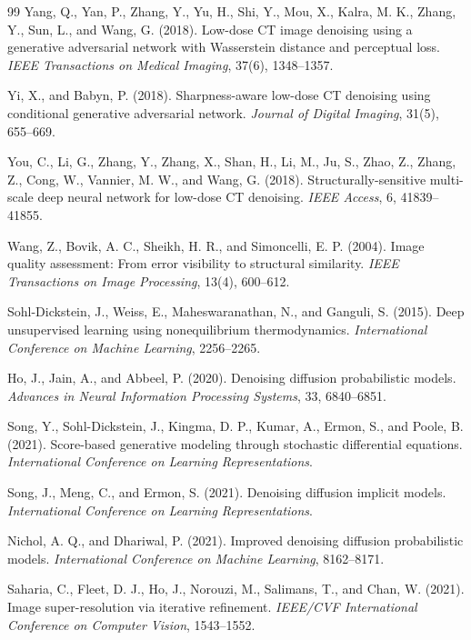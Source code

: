 \documentclass{article}
\begin{document}
{\begin{thebibliography}{99}
Yang, Q., Yan, P., Zhang, Y., Yu, H., Shi, Y., Mou, X., Kalra, M. K., Zhang, Y., Sun, L., and Wang, G. (2018).
Low-dose CT image denoising using a generative adversarial network with Wasserstein distance and perceptual loss.
\textit{IEEE Transactions on Medical Imaging}, 37(6), 1348--1357.

Yi, X., and Babyn, P. (2018).
Sharpness-aware low-dose CT denoising using conditional generative adversarial network.
\textit{Journal of Digital Imaging}, 31(5), 655--669.

You, C., Li, G., Zhang, Y., Zhang, X., Shan, H., Li, M., Ju, S., Zhao, Z., Zhang, Z., Cong, W., Vannier, M. W., and Wang, G. (2018).
Structurally-sensitive multi-scale deep neural network for low-dose CT denoising.
\textit{IEEE Access}, 6, 41839--41855.

Wang, Z., Bovik, A. C., Sheikh, H. R., and Simoncelli, E. P. (2004).
Image quality assessment: From error visibility to structural similarity.
\textit{IEEE Transactions on Image Processing}, 13(4), 600--612.

Sohl-Dickstein, J., Weiss, E., Maheswaranathan, N., and Ganguli, S. (2015).
Deep unsupervised learning using nonequilibrium thermodynamics.
\textit{International Conference on Machine Learning}, 2256--2265.

Ho, J., Jain, A., and Abbeel, P. (2020).
Denoising diffusion probabilistic models.
\textit{Advances in Neural Information Processing Systems}, 33, 6840--6851.

Song, Y., Sohl-Dickstein, J., Kingma, D. P., Kumar, A., Ermon, S., and Poole, B. (2021).
Score-based generative modeling through stochastic differential equations.
\textit{International Conference on Learning Representations}.

Song, J., Meng, C., and Ermon, S. (2021).
Denoising diffusion implicit models.
\textit{International Conference on Learning Representations}.

Nichol, A. Q., and Dhariwal, P. (2021).
Improved denoising diffusion probabilistic models.
\textit{International Conference on Machine Learning}, 8162--8171.

Saharia, C., Fleet, D. J., Ho, J., Norouzi, M., Salimans, T., and Chan, W. (2021).
Image super-resolution via iterative refinement.
\textit{IEEE/CVF International Conference on Computer Vision}, 1543--1552.


\end{thebibliography}}
\end{document}

